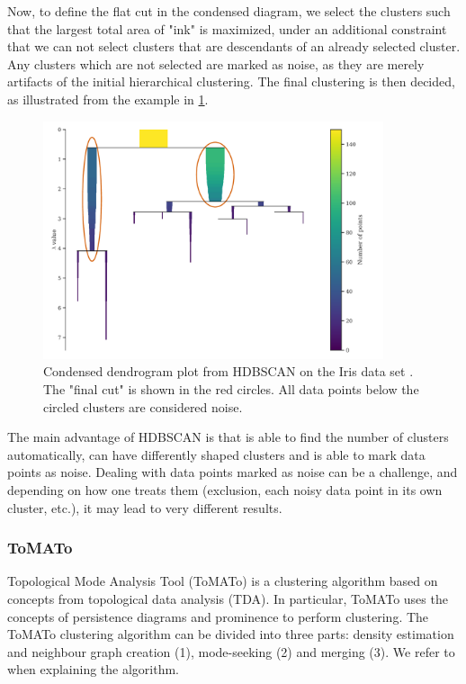 Now, to define the flat cut in the condensed diagram, we select the clusters such that the largest total area of "ink" is maximized, under an additional constraint that we can not select clusters that are descendants of an already selected cluster. Any clusters which are not selected are marked as noise, as they are merely artifacts of the initial hierarchical clustering. The final clustering is then decided, as illustrated from the example in \cref{fig:hdbscan-condensed-dendrogram-final-cut-example}.
\begin{figure}[H]
    \centering
    \includegraphics[width=10cm]{thesis/figures/hdbscan-condensed-tree-final-cut-example.pdf}
    \caption{Condensed dendrogram plot from HDBSCAN on the Iris data set \cite{Fisher1936}. The "final cut" is shown in the red circles. All data points below the circled clusters are considered noise.}
    \label{fig:hdbscan-condensed-dendrogram-final-cut-example}
\end{figure}

The main advantage of HDBSCAN is that is able to find the number of clusters automatically, can have differently shaped clusters and is able to mark data points as noise. Dealing with data points marked as noise can be a challenge, and depending on how one treats them (exclusion, each noisy data point in its own cluster, etc.), it may lead to very different results.

\subsubsection{ToMATo}
\label{sec:tomato-clustering}
Topological Mode Analysis Tool (ToMATo) \cite[2. ToMATo]{Oudot2015} is a clustering algorithm based on concepts from topological data analysis (TDA). In particular, ToMATo uses the concepts of persistence diagrams and prominence to perform clustering. The ToMATo clustering algorithm can be divided into three parts: density estimation and neighbour graph creation (1), mode-seeking (2) and merging (3). We refer to \cite[2. ToMATo]{Oudot2015} when explaining the algorithm.

